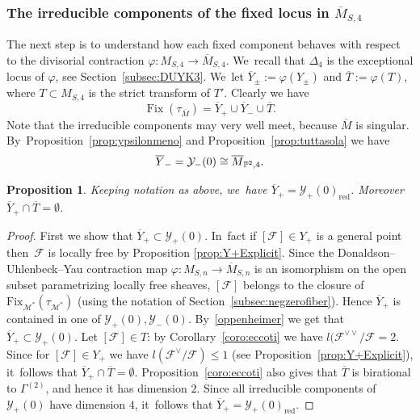 \documentclass[11pt]{article}
\newcommand\cF{\mathcal{F}}
\newcommand\cM{\mathcal{M}}
\newcommand\cY{\mathcal{Y}}
\DeclareMathOperator{\Fix}{Fix}
\let\es\emptyset
\let\ov\overline
\let\phi\varphi
\newtheorem{prop}[lemm]{Proposition}
\theoremstyle{definition}
\begin{document}
\subsubsection*{The irreducible components of the fixed locus in $\overline{M}_{S,4}$}
The next step is to understand how each fixed component behaves with respect to the divisorial contraction $\phi\colon M_{S,4}\to \overline{M}_{S,4}$. We~recall that $\Delta_4$ is the exceptional locus of $\phi$, see Section~\ref{subsec:DUYK3}. We~let $\ov{Y}_{\pm}:=\phi(Y_{\pm})$ and $\ov{T}:=\phi(T)$, where $T\subset M_{S,4}$ is the strict transform of $T'$.
Clearly we have
\begin{equation*}
\Fix(\tau_{\ov{M}})=\ov{Y}_{+}\cup \ov{Y}_{-}\cup\ov{T}.
\end{equation*}
Note that the irreducible components may very well meet, because $\ov{M}$ is singular. By~Proposition~\ref{prop:ypsilonmeno} and Proposition~\ref{prop:tuttasola}
we have
\begin{equation}\label{oppenheimer}
\ov{Y}_{-}=\cY_{-}(0)\cong \ov{M}_{\P^2,4}.
\end{equation}

\begin{prop}\label{prp:bobbysolo}
Keeping notation as above, we~have $\ov{Y}_{+}=\cY_{+}(0)_\mathrm{
red}$. Moreover
$\ov{Y}_{+}\cap\ov{T}=\es$.
\end{prop}

\begin{proof}
First we show that $\ov{Y}_{+}\subset\cY_{+}(0)$. In~fact if $[\cF]\in Y_{+}$ is a general point then~$\cF$ is locally free by Proposition \ref{prop:Y+Explicit}. Since the Donaldson--Uhlenbeck--Yau contraction map $\varphi\colon M_{S,n}\to \overline{M}_{S,n}$ is an isomorphism on the open subset parametrizing locally free sheaves, $[\cF]$ belongs to the closure of $\mathrm{Fix}_{\cM^*}(\tau_{\cM^*})$ (using the notation of Section~\ref{subsec:negzerofiber}). Hence $\ov{Y}_{+}$ is contained in one of $\cY_{+}(0),\cY_{-}(0)$. By~\eqref{oppenheimer} we get that $\ov{Y}_{+}\subset\cY_{+}(0)$. Let $[\cF]\in T$: by Corollary~\ref{coro:eccoti}
we have $l(\cF^{\vee\vee}/\cF=2$. Since for $[\cF]\in Y_{+}$ we have $l(\cF^{\vee}/\cF)\le 1$ (see Proposition~\ref{prop:Y+Explicit}), it~follows that
$\ov{Y}_{+}\cap\ov{T}=\es$.
Proposition~\ref{coro:eccoti} also gives that $\ov{T}$ is birational to $\mathsf{\Gamma}^{(2)}$, and hence it has dimension $2$.
Since all irreducible components of $\cY_{+}(0)$ have dimension $4$, it~follows that $\ov{Y}_{+}=\cY_{+}(0)_\mathrm{red}$.
\end{proof}
\end{document}
